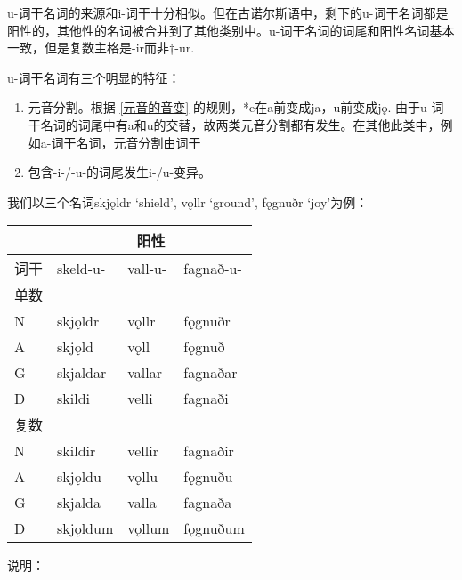 u-词干名词的来源和i-词干十分相似。但在古诺尔斯语中，剩下的u-词干名词都是阳性的，其他性的名词被合并到了其他类别中。u-词干名词的词尾和阳性名词基本一致，但是复数主格是-ir而非†-ur.

u-词干名词有三个明显的特征：

\begin{enumerate}[1)]
    \item
          元音分割。根据 \ref{元音的音变} 的规则，*e在a前变成ja，u前变成jǫ.
          由于u-词干名词的词尾中有a和u的交替，故两类元音分割都有发生。在其他此类中，例如a-词干名词，元音分割由词干
    \item
          包含-i-/-u-的词尾发生i-/u-变异。
  \end{enumerate}

  我们以三个名词skjǫldr `shield', vǫllr `ground', fǫgnuðr `joy'为例：

  \begin{longtable}{llll}
    \toprule
         & \multicolumn{3}{c}{\textbf{阳性}}                       \\
    \midrule
    \endhead
    \bottomrule
    \endfoot
    词干 & skeld-u-                 & vall-u- & fagnað-u- \\
    单数 &                          &         &           \\
    N    & skjǫldr                  & vǫllr   & fǫgnuðr   \\
    A    & skjǫld                   & vǫll    & fǫgnuð    \\
    G    & skjaldar                 & vallar  & fagnaðar  \\
    D    & skildi                   & velli   & fagnaði   \\
    复数 &                          &         &           \\
    N    & skildir                  & vellir  & fagnaðir  \\
    A    & skjǫldu                  & vǫllu   & fǫgnuðu   \\
    G    & skjalda                  & valla   & fagnaða   \\
    D    & skjǫldum                 & vǫllum  & fǫgnuðum  \\
  \end{longtable}

  说明：

